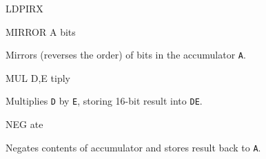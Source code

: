 \begin{basedescript}{
    \desclabelstyle{\multilinelabel}
    \desclabelwidth{3cm}}
\begin{DetailItem}{LDPIRX\ZXN}
        \begin{DetailEffects}
            \FlagsLDPIRX
        \end{DetailEffects}	

        \begin{DetailTiming}
                \end{DetailTiming}

    \end{DetailItem}


    \pagebreak
    \begin{DetailItem}{MIRROR A\ZXN}
        { bits}
        {}

        Mirrors (reverses the order) of bits in the accumulator {\tt A}.

        \begin{DetailEffects}
            \FlagsMIRRORa
        \end{DetailEffects}
				
        \begin{DetailTiming}
        \end{DetailTiming}


    \end{DetailItem}

    \begin{DetailItem}{MUL D,E\ZXN}
        {tiply}
        {\SymMUL}

        Multiplies {\tt D} by {\tt E}, storing 16-bit result into {\tt DE}.

        \begin{DetailEffects}
            \FlagsMULde
        \end{DetailEffects}
				
        \begin{DetailTiming}
        \end{DetailTiming}

    \end{DetailItem}

    \begin{DetailItem}{NEG}
        {ate}
        {\SymNEG}

        Negates contents of accumulator and stores result back to {\tt A}.


\end{DetailItem}
\end{basedescript}
